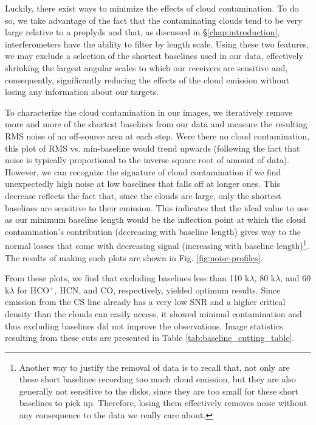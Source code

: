 Luckily, there exist ways to minimize the effects of cloud contamination. To do so, we take advantage of the fact that the contaminating clouds tend to be very large relative to a proplyds and that, as discussed in \S\ref{chap:introduction}, interferometers have the ability to filter by length scale. Using these two features, we may exclude a selection of the shortest baselines used in our data, effectively shrinking the largest angular scales to which our receivers are sensitive and, consequently, significantly reducing the effects of the cloud emission without losing any information about our targets.


To characterize the cloud contamination in our images, we iteratively remove more and more of the shortest baselines from our data and measure the resulting RMS noise of an off-source area at each step. Were there no cloud contamination, this plot of RMS vs. min-baseline would trend upwards (following the fact that noise is typically proportional to the inverse square root of amount of data). However, we can recognize the signature of cloud contamination if we find unexpectedly high noise at low baselines that falls off at longer ones. This decrease reflects the fact that, since the clouds are large, only the shortest baselines are sensitive to their emission. This indicates that the ideal value to use as our minimum baseline length would be the inflection point at which the cloud contamination's contribution (decreasing with baseline length) gives way to the normal losses that come with decreasing signal (increasing with baseline length)\footnote{Another way to justify the removal of data is to recall that, not only are these short baselines recording too much cloud emission, but they are also generally not sensitive to the disks, since they are too small for these short baselines to pick up. Therefore, losing them effectively removes noise without any consequence to the data we really care about.}. The results of making such plots are shown in Fig. \ref{fig:noise-profiles}.

From these plots, we find that excluding baselines less than 110 k$\lambda$, 80 k$\lambda$, and 60  k$\lambda$ for HCO$^{+}$, HCN, and CO, respectively, yielded optimum results. Since emission from the CS line already has a very low SNR and a higher critical density than the clouds can easily access, it showed minimal contamination and thus excluding baselines did not improve the observations. Image statistics resulting from these cuts are presented in Table \ref{tab:baseline_cutting_table}.


